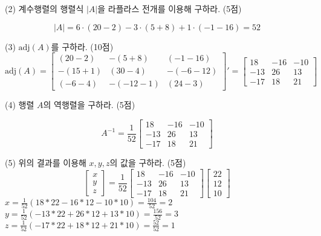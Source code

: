 \documentclass[aspectratio=169]{beamer}
\begin{document}
\begin{frame}
  (2) 계수행렬의 행렬식 \( |A| \)을 라플라스 전개를 이용해 구하라. (5점)

  \[
  |A| = 6 \cdot (20-2) - 3 \cdot (5+8) +1 \cdot (-1-16) = 52
  \]

  (3) \( \text{adj}(A) \)를 구하라. (10점)
  \[
    \text{adj}(A) = 
    \begin{bmatrix}
      (20-2) & -(5+8) & (-1-16) \\
      -(15+1) & (30-4) & -(-6-12) \\
      (-6-4) & -(-12-1) & (24 - 3)
    \end{bmatrix}'
    =\begin{bmatrix}
      18 & -16 & -10 \\
      -13 & 26 & 13 \\
      -17 & 18 & 21
    \end{bmatrix}
  \]


\end{frame}



\begin{frame}
  (4) 행렬 \( A \)의 역행렬을 구하라. (5점)

  \[
    A^{-1} = 
    \frac{1}{52}
    \begin{bmatrix}
      18 & -16 & -10 \\
      -13 & 26 & 13 \\
      -17 & 18 & 21
    \end{bmatrix}
  \]
  
  (5) 위의 결과를 이용해 \( x, y, z \)의 값을 구하라. (5점)  
  \[
    \begin{bmatrix}
      x \\
      y \\
      z 
    \end{bmatrix}
     = 
    \frac{1}{52}
    \begin{bmatrix}
      18 & -16 & -10 \\
      -13 & 26 & 13 \\
      -17 & 18 & 21
    \end{bmatrix}
    \begin{bmatrix}
      22 \\
      12 \\
      10 
    \end{bmatrix}
  \]
  $x = \frac{1}{52}(18*22 - 16*12 - 10*10) = \frac{104}{52} = 2$
  $y = \frac{1}{52}(-13*22 + 26*12 + 13*10) = \frac{156}{52} = 3$
  $z = \frac{1}{52}(-17*22 + 18*12 + 21*10) = \frac{52}{52} = 1$
\end{frame}
\end{document}

